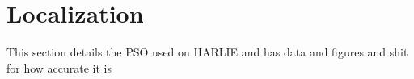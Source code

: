 \section{Localization}

This section details the PSO used on HARLIE and has data and figures and shit for how accurate it is
